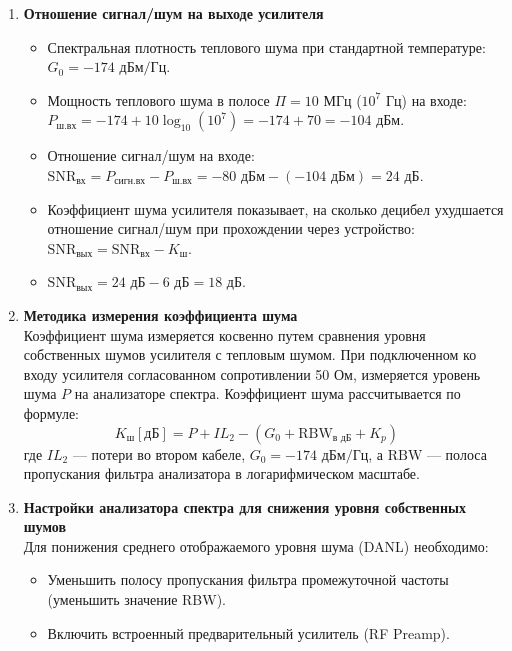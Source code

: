 \documentclass[11pt, a4paper]{article}
\begin{document}
\begin{enumerate}[label=\textbf{\arabic*.}]
    \item \textbf{Отношение сигнал/шум на выходе усилителя}
    \begin{itemize}
        \item Спектральная плотность теплового шума при стандартной температуре: $G_0 = -174 \text{ дБм/Гц}$.
        \item Мощность теплового шума в полосе $\Pi = 10 \text{ МГц}$ ($10^7 \text{ Гц}$) на входе: \\ $P_{\text{ш.вх}} = -174 + 10\log_{10}(10^7) = -174 + 70 = -104 \text{ дБм}$.
        \item Отношение сигнал/шум на входе: $\text{SNR}_{\text{вх}} = P_{\text{сигн.вх}} - P_{\text{ш.вх}} = -80 \text{ дБм} - (-104 \text{ дБм}) = 24 \text{ дБ}$.
        \item Коэффициент шума усилителя показывает, на сколько децибел ухудшается отношение сигнал/шум при прохождении через устройство: $\text{SNR}_{\text{вых}} = \text{SNR}_{\text{вх}} - K_{\text{ш}}$.
        \item $\text{SNR}_{\text{вых}} = 24 \text{ дБ} - 6 \text{ дБ} = 18 \text{ дБ}$.
    \end{itemize}

    \item \textbf{Методика измерения коэффициента шума}\\
    Коэффициент шума измеряется косвенно путем сравнения уровня собственных шумов усилителя с тепловым шумом. При подключенном ко входу усилителя согласованном сопротивлении 50 Ом, измеряется уровень шума $P$ на анализаторе спектра. Коэффициент шума рассчитывается по формуле:
    \begin{equation*}
        K_{\text{ш}}[\text{дБ}] = P + IL_2 - (G_0 + \text{RBW}_{\text{в дБ}} + K_p) \quad
    \end{equation*}
    где $IL_2$ --- потери во втором кабеле, $G_0 = -174 \text{ дБм/Гц}$, а $\text{RBW}$ --- полоса пропускания фильтра анализатора в логарифмическом масштабе.

    \item \textbf{Настройки анализатора спектра для снижения уровня собственных шумов}\\
    Для понижения среднего отображаемого уровня шума (DANL) необходимо:
    \begin{itemize}
        \item Уменьшить полосу пропускания фильтра промежуточной частоты (уменьшить значение RBW).
        \item Включить встроенный предварительный усилитель (RF Preamp).
    \end{itemize}


\end{enumerate}
\end{document}
